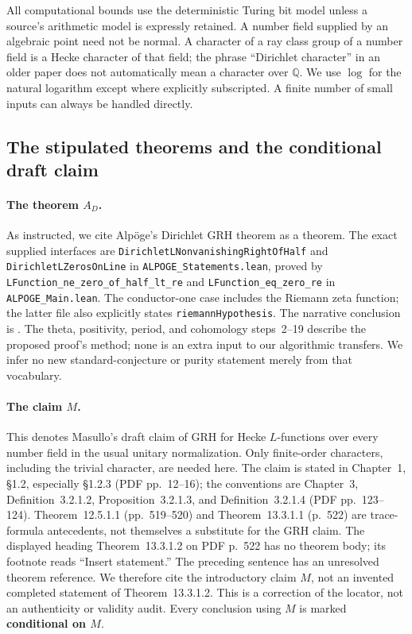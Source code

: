\documentclass[11pt,a4paper]{article}
\begin{document}
All computational bounds use the deterministic Turing bit model unless a
source's arithmetic model is expressly retained.  A number field supplied by
an algebraic point need not be normal.  A character of a ray class group of a
number field is a Hecke character of that field; the phrase ``Dirichlet
character'' in an older paper does not automatically mean a character over
$\mathbb Q$.  We use $\log$ for the natural logarithm except where explicitly
subscripted.  A finite number of small inputs can always be handled directly.

\subsection{The stipulated theorems and the conditional draft claim}

\paragraph{The theorem $A_D$.}
As instructed, we cite Alp\"oge's Dirichlet GRH theorem as a theorem.
The exact supplied interfaces are
\texttt{DirichletLNonvanishingRightOfHalf} and
\texttt{DirichletLZerosOnLine} in \texttt{ALPOGE\_Statements.lean}, proved by
\nolinkurl{LFunction_ne_zero_of_half_lt_re} and
\nolinkurl{LFunction_eq_zero_re} in \texttt{ALPOGE\_Main.lean}.
The conductor-one case includes the Riemann zeta function; the latter file
also explicitly states \texttt{riemannHypothesis}.  The narrative conclusion
is \cite[Remark, p.~4, step~20]{Alpoge2026}.  The theta, positivity, period,
and cohomology steps~2--19 describe the proposed proof's method; none is an
extra input to our algorithmic transfers.  We infer no new standard-conjecture
or purity statement merely from that vocabulary.

\paragraph{The claim $M$.}
This denotes Masullo's draft claim \cite{Masullo2026} of GRH for Hecke $L$-functions over every
number field in the usual unitary normalization.  Only finite-order characters,
including the trivial character, are needed here.  The claim is stated in
Chapter~1, \S1.2, especially \S1.2.3 (PDF pp.~12--16);
the conventions are Chapter~3, Definition~3.2.1.2,
Proposition~3.2.1.3, and Definition~3.2.1.4 (PDF pp.~123--124).
Theorem~12.5.1.1 (pp.~519--520) and Theorem~13.3.1.1 (p.~522) are
trace-formula antecedents, not themselves a substitute for the GRH claim.
The displayed heading Theorem~13.3.1.2 on PDF p.~522 has no theorem body;
its footnote reads ``Insert statement.''  The preceding sentence has an
unresolved theorem reference.  We therefore cite the introductory claim $M$,
not an invented completed statement of Theorem~13.3.1.2.
This is a correction of the locator, not an authenticity or validity audit.
Every conclusion using $M$ is marked \textbf{conditional on $M$}.
\end{document}
